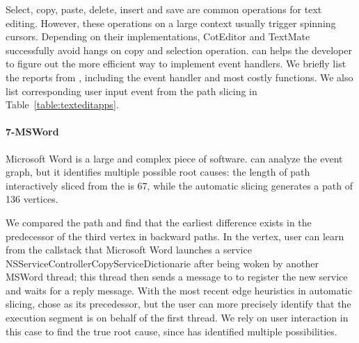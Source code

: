 Select, copy, paste, delete, insert and save are common operations for text
editing. However, these operations on a large context usually trigger spinning
cursors. Depending on their implementations, CotEditor and TextMate successfully
avoid hangs on copy and selection operation. \xxx can helps the developer to
figure out the more efficient way to implement event handlers. We briefly list
the reports from \spinningnode, including the event handler and most costly
functions. We also list corresponding user input event from the path slicing in
Table~\ref{table:texteditapps}.


\paragraph{7-MSWord}

Microsoft Word is a large and complex piece of software. \xxx can analyze the event graph, but
it identifies multiple possible root causes:
the length of path interactively sliced from the \spinningnode
is 67, while the automatic slicing generates a path of 136 vertices.

We compared the path and find that the earliest difference exists in the
predecessor of the third vertex in backward paths.
In the vertex, user can learn from the callstack that Microsoft Word launches a
service NSServiceControllerCopyServiceDictionarie after being woken by another
MSWord thread; this thread then sends a message to  to register the
new service and waits for a reply message. With the most recent edge heuristics
in automatic slicing, \xxx chose  as its precedessor, but the user
can more precisely identify that the execution segment is on behalf of the first
thread. We rely on user interaction in this case to find the true root cause,
since \xxx has identified multiple possibilities.

